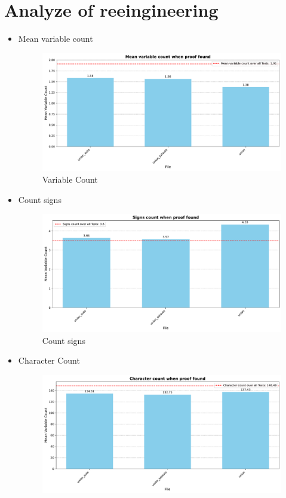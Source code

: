 \documentclass[english,version-2020-11]{uzl-thesis}
\begin{document}
    \section{Analyze of reeingineering}
      \begin{itemize}
        \item Mean variable count
          \begin{figure}[h!]
            \centering
            \includegraphics[width=\textwidth]{variable_count.pdf} %
            \caption{Variable Count}
            \label{fig:variable_count}
          \end{figure}
        \item Count signs
          \begin{figure}[h!]
            \centering
            \includegraphics[width=\textwidth]{signs_count.pdf} %
            \caption{Count signs}
            \label{fig:count_signs}
          \end{figure}
        \item Character Count
          \begin{figure}[h!]
            \centering
            \includegraphics[width=\textwidth]{character_count.pdf} %

\end{figure}
\end{itemize}
\end{document}
